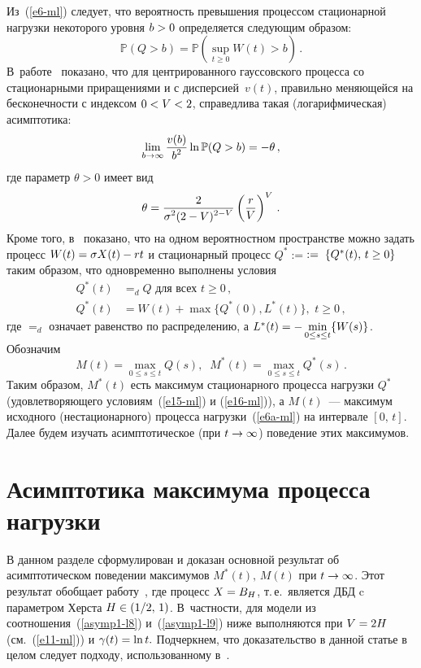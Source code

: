 \begin{multicols}{2}
Из~(\ref{e6-ml}) следует, что  вероятность превышения процессом
стационарной нагрузки некоторого  уровня  $b\hm>0$ определяется
следующим образом:
\begin{equation*}
\mathbb{P}( Q>b) = \mathbb{P}\left(\sup\limits_{t \geq 0}W(t)>b\right)\,.
\end{equation*}
В~работе~\cite{Duffy} показано, что для центрированного
гауссовского процесса со стационарными приращениями и с дисперсией~$v(t)$, 
правильно меняющейся на бесконечности  с индексом $0\hm<V\hm<2$,
справедлива такая (логарифмическая) асимптотика:
\begin{equation}
\lim\limits_{b \to \infty} \displaystyle\frac{\displaystyle v(b)\mathstrut}{\displaystyle b^2\mathstrut} \ln \mathbb{P}(Q>b)=-\theta\,,
\label{asymp1-l13}
\end{equation}
где параметр $\theta>0$ имеет   вид
\begin{equation}
\theta=\displaystyle\frac{\displaystyle 2\mathstrut}{\displaystyle \sigma^2(2-V)^{2-V}\mathstrut}\left( \displaystyle\frac{\displaystyle r\mathstrut}{\displaystyle V\mathstrut}
\right)^V\,.
\label{e11-ml}
\end{equation}
Кроме того, в~\cite{Konstantopoulos} показано, что на одном
веро\-ят\-ностном пространстве можно задать процесс $W(t)\hm=\sigma X(t)\hm-rt$ и
стационарный процесс $Q^*:=$\linebreak $:=\;\{Q^*(t),\, t\hm \geq 0\}$ таким образом,
что одновременно выполнены условия
\begin{align}
Q^*(t)&=_d Q \mbox{ для всех } t \geq 0\,,\label{e15-ml}\\
Q^*(t)&=W(t)+\max\{Q^*(0), L^*(t)\},\,\, t \geq 0\,,\label{e16-ml}
\end{align}
где $=_d$ означает равенство по распределению, а $L^*(t)\hm=-\min\limits_{0\le s\le t}\{W(s)\}$. 
Обозначим
\begin{equation*}
M(t)=\max\limits_{0 \leq s \leq t}Q(s),\;\; M^*(t)=\max\limits_{0 \leq s \leq
t}Q^*(s)\,. 
\end{equation*}
Таким образом, $M^*(t)$  есть  максимум стационарного процесса
нагрузки $Q^*$ (удовлетворяющего условиям~(\ref{e15-ml}) и (\ref{e16-ml})), а
$M(t)$~--- максимум исходного (нестационарного) процесса нагрузки~(\ref{e6a-ml}) 
на интервале $[0,\,t]$. Далее будем изучать
асимптотическое (при $t\hm\to \infty$) поведение этих максимумов.

\section{Асимптотика  максимума процесса нагрузки}

В данном разделе сформулирован и доказан основной результат об
асимптотическом поведении  максимумов $M^*(t),\,M(t)$ при $t\hm\to \infty$. 
Этот результат   обобщает  работу~\cite{Zeevi}, где процесс
$X\hm=B_H$, т.\,е.\  является  ДБД  c параметром Херста  $H\hm\in (1/2,\,1)$. 
В~част\-ности, для модели из~\cite{Zeevi} соотношения~(\ref{asymp1-l8}) и~(\ref{asymp1-l9}) 
ниже  выполняются при $V\hm=2H$ (см.~(\ref{e11-ml})) и  $\gamma(t)\hm=\ln t.$
 Подчеркнем, что доказательство в данной статье в целом следует подходу,
использованному в~\cite{Zeevi}.


\end{multicols}
